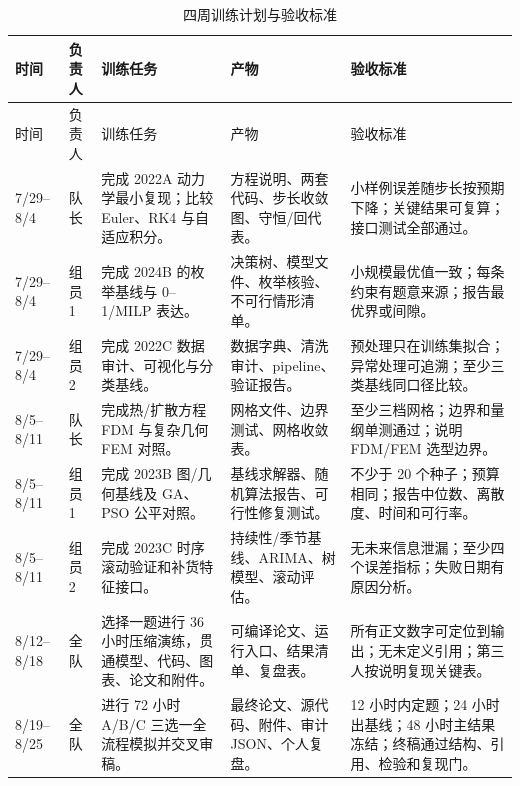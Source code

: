 \documentclass[UTF8,a4paper,12pt]{ctexart}
\begin{document}
\begin{longtable}{p{1.4cm}p{1.55cm}p{3.1cm}p{4.6cm}p{3.4cm}}
\caption{四周训练计划与验收标准}\label{tab:four-weeks}\\
\toprule
时间 & 负责人 & 训练任务 & 产物 & 验收标准\\
\midrule
\endfirsthead
\toprule
时间 & 负责人 & 训练任务 & 产物 & 验收标准\\
\midrule
\endhead
7/29--8/4 & 队长 & 完成 2022A 动力学最小复现；比较 Euler、RK4 与自适应积分。 & 方程说明、两套代码、步长收敛图、守恒/回代表。 & 小样例误差随步长按预期下降；关键结果可复算；接口测试全部通过。\\
7/29--8/4 & 组员1 & 完成 2024B 的枚举基线与 0--1/MILP 表达。 & 决策树、模型文件、枚举核验、不可行情形清单。 & 小规模最优值一致；每条约束有题意来源；报告最优界或间隙。\\
7/29--8/4 & 组员2 & 完成 2022C 数据审计、可视化与分类基线。 & 数据字典、清洗审计、pipeline、验证报告。 & 预处理只在训练集拟合；异常处理可追溯；至少三类基线同口径比较。\\
8/5--8/11 & 队长 & 完成热/扩散方程 FDM 与复杂几何 FEM 对照。 & 网格文件、边界测试、网格收敛表。 & 至少三档网格；边界和量纲单测通过；说明 FDM/FEM 选型边界。\\
8/5--8/11 & 组员1 & 完成 2023B 图/几何基线及 GA、PSO 公平对照。 & 基线求解器、随机算法报告、可行性修复测试。 & 不少于 20 个种子；预算相同；报告中位数、离散度、时间和可行率。\\
8/5--8/11 & 组员2 & 完成 2023C 时序滚动验证和补货特征接口。 & 持续性/季节基线、ARIMA、树模型、滚动评估。 & 无未来信息泄漏；至少四个误差指标；失败日期有原因分析。\\
8/12--8/18 & 全队 & 选择一题进行 36 小时压缩演练，贯通模型、代码、图表、论文和附件。 & 可编译论文、运行入口、结果清单、复盘表。 & 所有正文数字可定位到输出；无未定义引用；第三人按说明复现关键表。\\
8/19--8/25 & 全队 & 进行 72 小时 A/B/C 三选一全流程模拟并交叉审稿。 & 最终论文、源代码、附件、审计 JSON、个人复盘。 & 12 小时内定题；24 小时出基线；48 小时主结果冻结；终稿通过结构、引用、检验和复现门。\\
\bottomrule
\end{longtable}

\PaperAnalysisBlock
\end{document}
